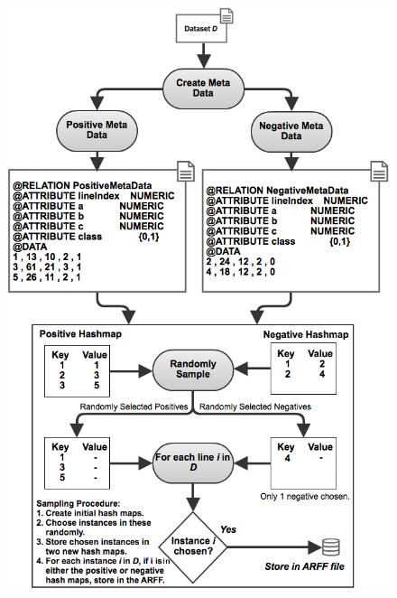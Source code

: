 \documentclass[twoside,a4paper]{refart}
\begin{document}
\begin{figure}[!htbp]
  \begin{center}
    \leavevmode
    \ifpdf
      \includegraphics[keepaspectratio,scale=0.45]{MetaData.png}
    \else

\end{center}
\end{figure}
\end{document}
